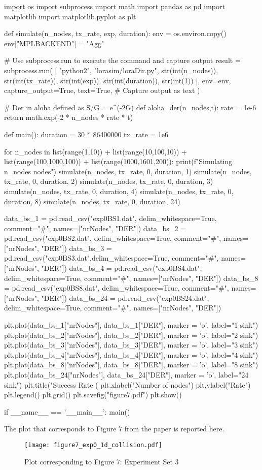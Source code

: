 \begin{python}
import os
import subprocess
import math
import pandas as pd
import matplotlib
import matplotlib.pyplot as plt

def simulate(n_nodes, tx_rate, exp, duration):
    env = os.environ.copy()
    env["MPLBACKEND"] = "Agg"

    # Use subprocess.run to execute the command and capture output
    result = subprocess.run(
        [
            "python2",
            "lorasim/loraDir.py",
            str(int(n_nodes)),
            str(int(tx_rate)),
            str(int(exp)),
            str(int(duration)),
            str(int(1))
        ],
        env=env,
        capture_output=True,
        text=True,  # Capture output as text
    )

# Der in aloha defined as S/G = e^(-2G)
def aloha_der(n_nodes,t):
    rate = 1e-6
    return math.exp(-2 * n_nodes * rate * t)

def main():
    duration = 30 * 86400000
    tx_rate = 1e6

    for n_nodes in list(range(1,10)) + list(range(10,100,10)) + list(range(100,1000,100)) + list(range(1000,1601,200)):
        print(f"Simulating {n_nodes} nodes")
        simulate(n_nodes, tx_rate, 0, duration, 1)
        simulate(n_nodes, tx_rate, 0, duration, 2)
        simulate(n_nodes, tx_rate, 0, duration, 3)
        simulate(n_nodes, tx_rate, 0, duration, 4)
        simulate(n_nodes, tx_rate, 0, duration, 8)
        simulate(n_nodes, tx_rate, 0, duration, 24)

    data_bs_1 = pd.read_csv("exp0BS1.dat", delim_whitespace=True, comment="#", names=["nrNodes", "DER"])
    data_bs_2 = pd.read_csv("exp0BS2.dat", delim_whitespace=True, comment="#", names=["nrNodes", "DER"])
    data_bs_3 = pd.read_csv("exp0BS3.dat",delim_whitespace=True, comment="#", names=["nrNodes", "DER"])
    data_bs_4 = pd.read_csv("exp0BS4.dat", delim_whitespace=True, comment="#", names=["nrNodes", "DER"])
    data_bs_8 = pd.read_csv("exp0BS8.dat", delim_whitespace=True, comment="#", names=["nrNodes", "DER"])
    data_bs_24 = pd.read_csv("exp0BS24.dat", delim_whitespace=True, comment="#", names=["nrNodes", "DER"])
   
    plt.plot(data_bs_1["nrNodes"], data_bs_1["DER"], marker = 'o', label="1 sink")
    plt.plot(data_bs_2["nrNodes"], data_bs_2["DER"], marker = 'o', label="2 sink")
    plt.plot(data_bs_3["nrNodes"], data_bs_3["DER"], marker = 'o', label="3 sink")
    plt.plot(data_bs_4["nrNodes"], data_bs_4["DER"], marker = 'o', label="4 sink")
    plt.plot(data_bs_8["nrNodes"], data_bs_8["DER"], marker = 'o', label="8 sink")
    plt.plot(data_bs_24["nrNodes"], data_bs_24["DER"], marker = 'o', label="24 sink")
    plt.title("Success Rate (%
    plt.xlabel("Number of nodes")
    plt.ylabel("Rate")
    plt.legend()
    plt.grid()
    plt.savefig("figure7.pdf")
    plt.show()

if __name__ == '__main__':
    main()

\end{python}

The plot that corresponds to Figure 7 from the paper is reported here.
\begin{figure}[H]
    \centering
    \texttt{[image: figure7\_exp0\_1d\_collision.pdf]}
    \caption{Plot corresponding to Figure 7: Experiment Set 3}
\end{figure}


